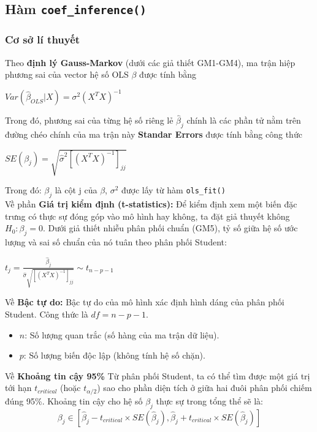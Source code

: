 \subsection{Hàm \texttt{coef\_inference()}}

\subsubsection{Cơ sở lí thuyết}
Theo \textbf{định lý Gauss-Markov} (dưới các giả thiết GM1-GM4), ma trận hiệp phương sai của vector hệ số OLS $\beta$ được tính bằng
\begin{center}
    $Var(\hat{\beta}_{OLS}|X) = \sigma^2(X^T X)^{-1}$
\end{center}
Trong đó, phương sai của từng hệ số riêng lẻ $\hat{\beta}_j$ chính là các phần tử nằm trên đường chéo chính của ma trận này
\textbf{Standar Errors} được tính bằng công thức
\begin{center}
    \begin{center}
        $SE(\beta_j) = \sqrt{\hat{\sigma}^2 [(X^T X)^{-1}]_{jj}}$
    \end{center}
\end{center}
Trong đó: $\beta_j$ là cột j của $\beta$, $\sigma^2$ được lấy từ hàm \texttt{ols\_fit()} \\[0.25cm]
Về phần \textbf{Giá trị kiểm định (t-statistics):} Để kiểm định xem một biến đặc trưng có thực sự đóng góp vào mô hình hay không, ta đặt giả thuyết không $H_0: \beta_j = 0$. Dưới giả thiết nhiễu phân phối chuẩn (GM5), tỷ số giữa hệ số ước lượng và sai số chuẩn của nó tuân theo phân phối Student:
    \begin{center}
        $t_j = \frac{\hat{\beta}_j}{\hat{\sigma}\sqrt{[(X^T X)^{-1}]_{jj}}} \sim t_{n-p-1}$
    \end{center}
Về \textbf{Bậc tự do:}
Bậc tự do của mô hình xác định hình dáng của phân phối Student. Công thức là $df = n - p - 1$.  

\begin{itemize}
\item $n$: Số lượng quan trắc (số hàng của ma trận dữ liệu).
\item $p$: Số lượng biến độc lập (không tính hệ số chặn).
\end{itemize}

Về \textbf{Khoảng tin cậy 95\%}
Từ phân phối Student, ta có thể tìm được một giá trị tới hạn $t_{critical}$ (hoặc $t_{\alpha/2}$) sao cho phần diện tích ở giữa hai đuôi phân phối chiếm đúng 95\%. Khoảng tin cậy cho hệ số $\beta_j$ thực sự trong tổng thể sẽ là:$$\beta_j \in [\hat{\beta}_j - t_{critical} \times SE(\hat{\beta}_j), \hat{\beta}_j + t_{critical} \times SE(\hat{\beta}_j)]$$

